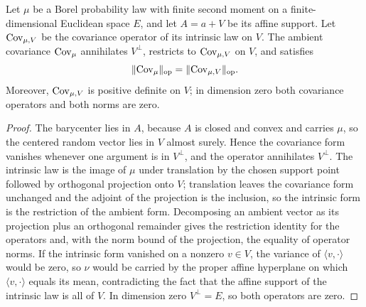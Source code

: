 \begin{lemma}
  \label{lem:ambient-intrinsic-covariance}
  \leanok
  Let $\mu$ be a Borel probability law with finite second moment on a finite-dimensional Euclidean
  space $E$, and let $A=a+V$ be its affine support.  Let $\operatorname{Cov}_{\mu,V}$ be the covariance operator
  of its intrinsic law on $V$.  The ambient covariance $\operatorname{Cov}_\mu$ annihilates $V^\perp$, restricts
  to $\operatorname{Cov}_{\mu,V}$ on $V$, and satisfies
  \[
    \lVert\operatorname{Cov}_\mu\rVert_{\mathrm{op}}=\lVert\operatorname{Cov}_{\mu,V}\rVert_{\mathrm{op}}.
  \]
  Moreover, $\operatorname{Cov}_{\mu,V}$ is positive definite on $V$; in dimension zero both covariance
  operators and both norms are zero.
\end{lemma}
\begin{proof}
  \leanok
  The barycenter lies in $A$, because $A$ is closed and convex and carries $\mu$, so the centered
  random vector lies in $V$ almost surely.  Hence the covariance form vanishes whenever one
  argument is in $V^\perp$, and the operator annihilates $V^\perp$.  The intrinsic law is the
  image of $\mu$ under translation by the chosen support point followed by orthogonal projection
  onto $V$; translation leaves the covariance form unchanged and the adjoint of the projection is
  the inclusion, so the intrinsic form is the restriction of the ambient form.  Decomposing an
  ambient vector as its projection plus an orthogonal remainder gives the restriction identity for
  the operators and, with the norm bound of the projection, the equality of operator norms.  If the
  intrinsic form vanished on a nonzero $v\in V$, the variance of $\langle v,\cdot\rangle$ would be
  zero, so $\nu$ would be carried by the proper affine hyperplane on which $\langle v,\cdot\rangle$
  equals its mean, contradicting the fact that the affine support of the intrinsic law is all of
  $V$.  In dimension zero $V^\perp=E$, so both operators are zero.
\end{proof}

